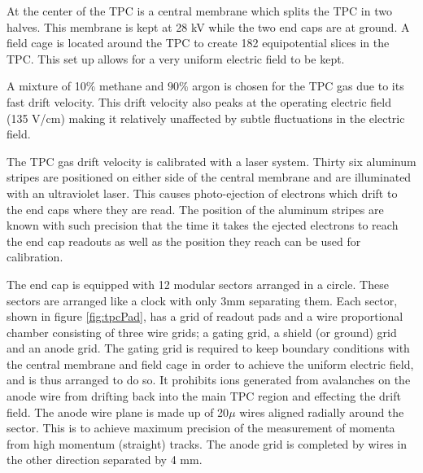 \documentclass[abstract = on,listof=totoc, bibliography=totoc]{scrreprt}
\begin{document}
At the center of the TPC is a central membrane which splits the TPC in two halves. This membrane is kept at 28 kV while the two end caps are at ground. A field cage is located around the TPC to create 182 equipotential slices in the TPC. This set up allows for a very uniform electric field to be kept.   

A mixture of 10$\%$ methane and $90\%$ argon is chosen for the TPC gas due to its fast drift velocity. This drift velocity also peaks at the operating electric field (135 V/cm) making it relatively unaffected by subtle fluctuations in the electric field.

The TPC gas drift velocity is calibrated with a laser system. Thirty six aluminum stripes are positioned on either side of the central membrane and are illuminated with an ultraviolet laser. This causes photo-ejection of electrons which drift to the end caps where they are read. The position of the aluminum stripes are known with such precision that the time it takes the ejected electrons to reach the end cap readouts as well as the position they reach can be used for calibration. 

The end cap is equipped with 12 modular sectors arranged in a circle. These sectors are arranged like a clock with only 3mm separating them. Each sector, shown in figure \ref{fig:tpcPad}, has a grid of readout pads and a wire proportional chamber consisting of three wire grids; a gating grid, a shield (or ground) grid and an anode grid. The gating grid is required to keep boundary conditions with the central membrane and field cage in order to achieve the uniform electric field, and is thus arranged to do so. It prohibits ions generated from avalanches on the anode wire from drifting back into the main TPC region and effecting the drift field. The anode wire plane is made up of 20$\mu$ wires aligned radially around the sector. This is to achieve maximum precision of the measurement of momenta from high momentum (straight) tracks. The anode grid is completed by wires in the other direction separated by 4 mm.
\end{document}
